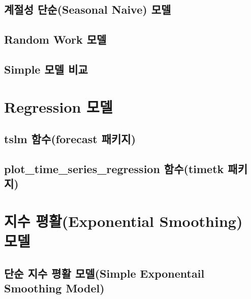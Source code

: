 \documentclass[
]{book}
\begin{document}
\hypertarget{uxacc4uxc808uxc131-uxb2e8uxc21cseasonal-naive-uxbaa8uxb378}{%
\subsection{계절성 단순(Seasonal Naive) 모델}\label{uxacc4uxc808uxc131-uxb2e8uxc21cseasonal-naive-uxbaa8uxb378}}

\hypertarget{random-work-uxbaa8uxb378}{%
\subsection{Random Work 모델}\label{random-work-uxbaa8uxb378}}

\hypertarget{simple-uxbaa8uxb378-uxbe44uxad50}{%
\subsection{Simple 모델 비교}\label{simple-uxbaa8uxb378-uxbe44uxad50}}

\hypertarget{regression-uxbaa8uxb378}{%
\section{Regression 모델}\label{regression-uxbaa8uxb378}}

\hypertarget{tslm-uxd568uxc218forecast-uxd328uxd0a4uxc9c0}{%
\subsection{tslm 함수(forecast 패키지)}\label{tslm-uxd568uxc218forecast-uxd328uxd0a4uxc9c0}}

\hypertarget{plot_time_series_regression-uxd568uxc218timetk-uxd328uxd0a4uxc9c0}{%
\subsection{plot\_time\_series\_regression 함수(timetk 패키지)}\label{plot_time_series_regression-uxd568uxc218timetk-uxd328uxd0a4uxc9c0}}

\hypertarget{uxc9c0uxc218-uxd3c9uxd65cexponential-smoothing-uxbaa8uxb378}{%
\section{지수 평활(Exponential Smoothing) 모델}\label{uxc9c0uxc218-uxd3c9uxd65cexponential-smoothing-uxbaa8uxb378}}

\hypertarget{uxb2e8uxc21c-uxc9c0uxc218-uxd3c9uxd65c-uxbaa8uxb378simple-exponentail-smoothing-model}{%
\subsection{단순 지수 평활 모델(Simple Exponentail Smoothing Model)}\label{uxb2e8uxc21c-uxc9c0uxc218-uxd3c9uxd65c-uxbaa8uxb378simple-exponentail-smoothing-model}}
\end{document}
